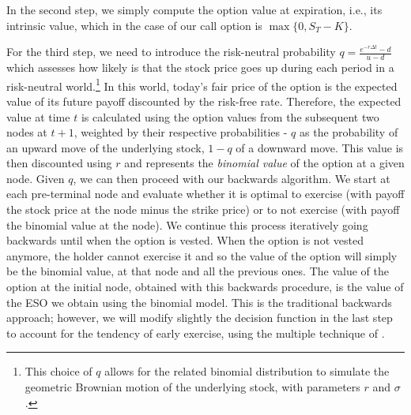 In the second step, we simply compute the option value at expiration, i.e., its intrinsic value, which in the case of our call option is $\max \{0, S_T - K \}$.

For the third step, we need to introduce the risk-neutral probability $q = \frac{e^{-r \Delta t} - d}{u-d}$ which assesses how likely is that the stock price goes up during each period in a risk-neutral world.\footnote{This choice of $q$ allows for the related binomial distribution to simulate the geometric Brownian motion of the underlying stock, with parameters $r$ and $\sigma$.} In this world, today's fair price of the option is the expected value of its future payoff discounted by the risk-free rate. Therefore, the expected value at time $t$ is calculated using the option values from the subsequent two nodes at $t+1$, weighted by their respective probabilities - $q$ as the probability of an upward move of the underlying stock, $1-q$ of a downward move. This value is then discounted using $r$ and represents the \textit{binomial value} of the option at a given node. 
Given $q$, we can then proceed with our backwards algorithm. We start at each pre-terminal node and evaluate whether it is optimal to exercise (with payoff the stock price at the node minus the strike price) or to not exercise (with payoff the binomial value at the node). We continue this process iteratively going backwards until when the option is vested. When the option is not vested anymore, the holder cannot exercise it and so the value of the option will simply be the binomial value, at that node and all the previous ones.
The value of the option at the initial node, obtained with this backwards procedure, is the value of the ESO we obtain using the binomial model.
This is the traditional backwards approach; however, we will modify slightly the decision function in the last step to account for the tendency of early exercise, using the multiple technique of \cite{cox1979option}.


